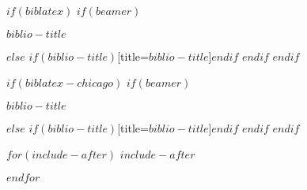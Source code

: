 \documentclass[
    $if(fontsize)$
      $fontsize$,
    $endif$
    $if(lang)$
      $babel-lang$,
    $endif$
    $if(papersize)$
      $papersize$paper,
    $endif$
    $if(beamer)$
        ignorenonframetext,
        $if(handout)$
          handout,
        $endif$
        $if(aspectratio)$
          aspectratio=$aspectratio$,
        $endif$
    $endif$
    $for(classoption)$
      $classoption$$sep$,
    $endfor$
]{$documentclass$}
\newif\ifbibliography
\begin{document}
$if(biblatex)$
    $if(beamer)$
    \begin{frame}[allowframebreaks]{$biblio-title$}
      \bibliographytrue
      \printbibliography[heading=none]
    \end{frame}
    $else$
    \printbibliography$if(biblio-title)$[title=$biblio-title$]$endif$
    $endif$
$endif$

$if(biblatex-chicago)$
    $if(beamer)$
    \begin{frame}[allowframebreaks]{$biblio-title$}
      \bibliographytrue
      \printbibliography[heading=none]
    \end{frame}
    $else$
    \printbibliography$if(biblio-title)$[title=$biblio-title$]$endif$
    $endif$
$endif$

$for(include-after)$
$include-after$

$endfor$
\end{document}

